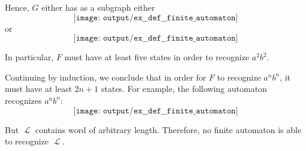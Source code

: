 \begin{example}
\begin{thmenum}
    Hence, \( G \) either has as a subgraph either
    \begin{equation*}
      \texttt{[image: output/ex\_\_def\_\_finite\_automaton]}
    \end{equation*}
    or
    \begin{equation*}
      \texttt{[image: output/ex\_\_def\_\_finite\_automaton]}
    \end{equation*}

    In particular, \( F \) must have at least five states in order to recognize \( a^2 b^2 \).

    Continuing by induction, we conclude that in order for \( F \) to recognize \( a^n b^n \), it must have at least \( 2n + 1 \) states. For example, the following automaton recognizes \( a^n b^n \):
    \begin{equation*}
      \texttt{[image: output/ex\_\_def\_\_finite\_automaton]}
    \end{equation*}

    But \( \mscrL \) contains word of arbitrary length. Therefore, no finite automaton is able to recognize \( \mscrL \).
  \end{thmenum}
\end{example}

